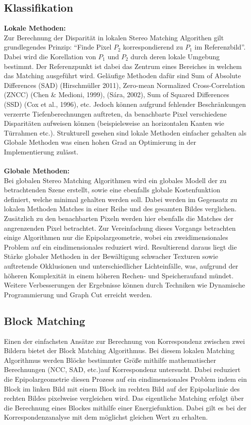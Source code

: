 \subsection{Klassifikation}
\label{subsec:stereo_matching_classification}
\textbf{Lokale Methoden:}\\
Zur Berechnung der Disparität in lokalen Stereo Matching Algorithen gilt grundlegendes Prinzip: “Finde Pixel $P_2$ korrespondierend zu $P_1$ im Referenzbild”. Dabei wird die Korellation von $P_1$ und $P_2$ durch deren lokale Umgebung bestimmt. Der Referenzpunkt ist dabei das Zentrum eines Bereiches in welchem das Matching ausgeführt wird. Geläufige Methoden dafür sind Sum of Absolute Differences (SAD) (Hirschmüller 2011), Zero-mean Normalized Cross-Correlation (ZNCC) (Chen \& Medioni, 1999), (Sára, 2002), Sum of Squared Differences (SSD) (Cox et al., 1996), etc.
Jedoch können aufgrund fehlender Beschränkungen verzerrte Tiefenberechnungen auftreten, da benachbarte Pixel verschiedene Disparitäten aufweisen können (beispielsweise an horizontalen Kanten wie Türrahmen etc.). Strukturell gesehen sind lokale Methoden einfacher gehalten als Globale Methoden was einen hohen Grad an Optimierung in der Implementierung zulässt.\\\\
\textbf{Globale Methoden:}\\
Bei globalen Stereo Matching Algorithmen wird ein globales Modell der zu betrachtenden Szene erstellt, sowie eine ebenfalls globale Kostenfunktion definiert, welche minimal gehalten werden soll. Dabei werden im Gegensatz zu lokalen Methoden Matches in einer Reihe und des gesamten Bildes verglichen. Zusätzlich zu den benachbarten Pixeln werden hier ebenfalls die Matches der angrenzenden Pixel betrachtet. Zur Vereinfachung dieses Vorgangs betrachten einige Algorithmen nur die Epipolargeometrie, wobei ein zweidimensionales Problem auf ein eindimensionales reduziert wird. Resultierend daraus liegt die Stärke globaler Methoden in der Bewältigung schwacher Texturen sowie auftretende Okklusionen und unterschiedlicher Lichteinfälle, was, aufgrund der höheren Komplexität in einem höheren Rechen- und Speicheraufand mündet. Weitere Verbesserungen der Ergebnisse können durch Techniken wie Dynamische Programmierung und Graph Cut erreicht werden.

\subsection{Block Matching}
\label{subsec:stereo_matching_bm}
Einen der einfachsten Ansätze zur Berechnung von Korrespondenz zwischen zwei Bildern bietet der Block Matching Algorithmus. Bei diesem lokalen Matching Algorithmus werden Blöcke bestimmter Größe mithilfe mathematischer Berechnungen (NCC, SAD, etc.)auf Korrespondenz untersucht. Dabei reduziert die Epipolargeometrie diesen Prozess auf ein eindimensionales Problem indem ein Block im linken Bild mit einem Block im rechten Bild auf der Epipolarlinie des rechten Bildes pixelweise vergleichen wird. Das eigentliche Matching erfolgt über die Berechnung eines Blockes mithilfe einer Energiefunktion. Dabei gilt es bei der Korrespondenzanalyse mit dem möglichst gleichen Wert zu erhalten. 

